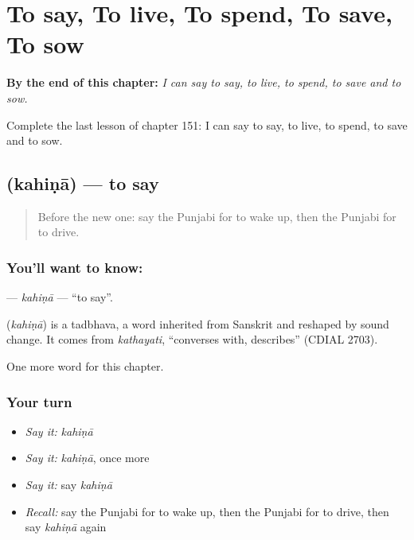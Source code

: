 
\chapter{To say, To live, To spend, To save, To sow}
\label{ch:pa-to-say-to-live-to-spend-to-save-to-sow}

\begin{chapteropening}
\textbf{By the end of this chapter:} \emph{I can say to say, to live, to spend, to save and to sow.}

Complete the last lesson of chapter 151: I can say to say, to live, to spend, to save and to sow.
\end{chapteropening}

\section[\texorpdfstring{\pa{ਕਹਿਣਾ} (kahiṇā)}{ਕਹਿਣਾ (kahiṇā)}]{ (kahiṇā) — to say}

\label{lesson:PA-C151-kahina}



\begin{quote}
Before the new one: say the Punjabi for to wake up, then the Punjabi for to drive.
\end{quote}

\subsection*{You'll want to know: }
\textbf{} — \emph{kahiṇā} — \textquotedblleft{}to say\textquotedblright{}.

\begin{cousinweb}
\textbf{} (\emph{kahiṇā}) is a tadbhava, a word inherited from Sanskrit and reshaped by sound change. It comes from \emph{kathayati}, \textquotedblleft{}converses with, describes\textquotedblright{} (CDIAL 2703).
\end{cousinweb}

\begin{grammarlens}[title={What you've built}]
One more word for this chapter.
\end{grammarlens}

\subsection*{Your turn}
\begin{itemize}
\raggedright
  \item \emph{Say it:} \emph{kahiṇā}
  \item \emph{Say it:} \emph{kahiṇā}, once more
  \item \emph{Say it:} say \emph{kahiṇā}
  \item \emph{Recall:} say the Punjabi for to wake up, then the Punjabi for to drive, then say \emph{kahiṇā} again
\end{itemize}

